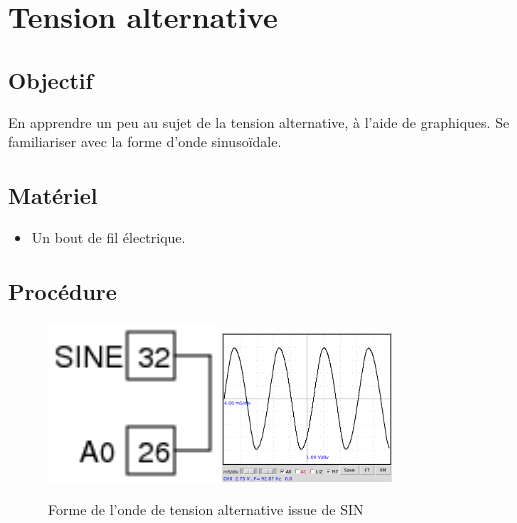 \documentclass{book}
\begin{document}




\section{Tension alternative}



\subsection{Objectif}


En apprendre un peu au sujet de la tension alternative, à l'aide de graphiques. Se familiariser avec la forme d'onde sinusoïdale.




\subsection{Matériel}


\begin{itemize}
  \item Un bout de fil électrique.
\end{itemize}

\subsection{Procédure}


\begin{figure}[h!]
\begin{center}
\caption{\label{fig:Sinewave}Forme de l'onde de tension alternative issue de SIN }\vspace{0.5em}
\includegraphics[width=0.4\textwidth, height=0.3\textwidth, keepaspectratio]{Schematic-sine-a0.png}
\includegraphics[width=0.4\textwidth, height=0.3\textwidth, keepaspectratio]{Pic-sinewave90hz.png}
\end{center}
\end{figure}
\end{document}
